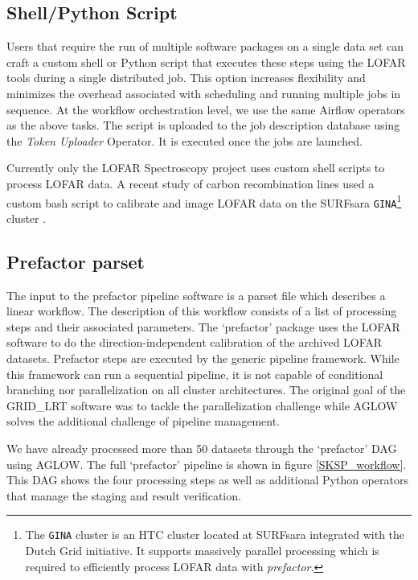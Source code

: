 \subsection{Shell/Python Script}

Users that require the run of multiple software packages on a single data set can craft a custom shell or Python script that executes these steps using the LOFAR tools during a single distributed job. This option increases flexibility and minimizes the overhead associated with scheduling and running multiple jobs in sequence. At the workflow orchestration level, we use the same Airflow operators as the above tasks. The script is uploaded to the job description database using the \textit{Token Uploader} Operator. It is executed once the jobs are launched. 

Currently only the LOFAR Spectroscopy project uses custom shell scripts to process LOFAR data. A recent study of carbon recombination lines used a custom bash script to calibrate and image LOFAR data on the SURFsara \texttt{GINA}\footnote{The \texttt{GINA} cluster is an HTC cluster located at SURFsara integrated with the Dutch Grid initiative. It supports massively parallel processing which is required to efficiently process LOFAR data with \textit{prefactor}. } cluster \cite{pedro}. 

\subsection{Prefactor parset}

The input to the prefactor pipeline software is a parset file which describes a linear workflow. The description of this workflow consists of a list of processing steps and their associated parameters. The `prefactor' package uses the LOFAR software to do the direction-independent calibration of the archived LOFAR datasets. Prefactor steps are executed by the generic pipeline framework\cite{cookbook}. While this framework can run a sequential pipeline, it is not capable of conditional branching nor parallelization on all cluster architectures. The original goal of the GRID\_LRT software was to tackle the parallelization challenge while AGLOW solves the additional challenge of pipeline management. 

We have already processed more than 50 datasets through the `prefactor' DAG using AGLOW. The full `prefactor' pipeline is shown in figure \ref{SKSP_workflow}. This DAG shows the four processing steps as well as additional Python operators that manage the staging and result verification. 

